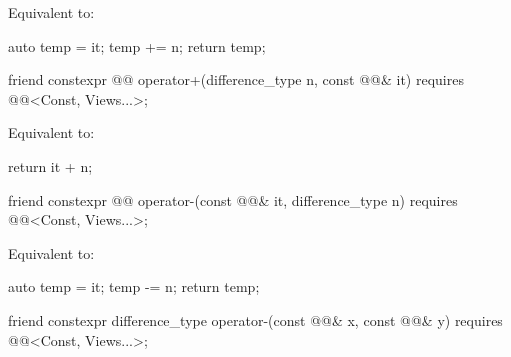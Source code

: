 \begin{itemdescr}
\pnum
\effects
Equivalent to:
\begin{codeblock}
auto temp = it;
temp += n;
return temp;
\end{codeblock}
\end{itemdescr}

%
\begin{itemdecl}
friend constexpr @@ operator+(difference_type n, const @@& it)
  requires @@<Const, Views...>;
\end{itemdecl}

\begin{itemdescr}
\pnum
\effects
Equivalent to:
\begin{codeblock}
return it + n;
\end{codeblock}
\end{itemdescr}

%
\begin{itemdecl}
friend constexpr @@ operator-(const @@& it, difference_type n)
  requires @@<Const, Views...>;
\end{itemdecl}

\begin{itemdescr}
\pnum
\effects
Equivalent to:
\begin{codeblock}
auto temp = it;
temp -= n;
return temp;
\end{codeblock}
\end{itemdescr}

%
\begin{itemdecl}
friend constexpr difference_type operator-(const @@& x, const @@& y)
  requires @@<Const, Views...>;
\end{itemdecl}

